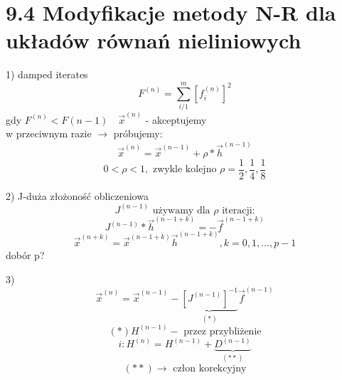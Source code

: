 \section{9.4 Modyfikacje metody N-R dla układów równań nieliniowych}

\begin{frame}{}
  \begin{block}{1) damped iterates}
    $$F^{(n)}=\sum_{i/1}^{m} [f_i^{(n)}]^2$$
    gdy $F^{(n)}<F{(n-1)}\quad\overrightarrow{x}^{(n)}$ - akceptujemy\\
    w przeciwnym razie $\rightarrow$ próbujemy:
    $$\overrightarrow{x}^{(n)}=\overrightarrow{x}^{(n-1)}+\rho*\overrightarrow{h}^{(n-1)}$$
    $$0<\rho<1,\text{ zwykle kolejno } \rho=\frac{1}{2},\frac{1}{4},\frac{1}{8}$$
  \end{block}
\end{frame}

\begin{frame}{}
  \begin{block}{2)}
    J-duża złożoność obliczeniowa
    $$J^{(n-1)}\text{ używamy dla }\rho\text{ iteracji:}$$
    $$J^{(n-1)}*\overrightarrow{h}^{(n-1+k)}=-\overrightarrow{f}^{(n-1+k)}$$
    $$\overrightarrow{x}^{(n+k)}=\overrightarrow{x}^{(n-1+k)}\overrightarrow{h}^{(n-1+k)}, k=0,1,...,p-1$$
    dobór p?
  \end{block}
\end{frame}

\begin{frame}{}
  \begin{block}{3)}
    $$\overrightarrow{x}^{(n)}=\overrightarrow{x}^{(n-1)}-\underbrace{[J^{(n-1)}]^{-1}}_{(*)}\overrightarrow{f}^{(n-1)}$$
    $$(*)H^{(n-1)}-\text{ przez przybliżenie}$$
    $${i:H^{(n)}=H^{(n-1)}+\underbrace{D^{(n-1)}}_{(**)}}$$
    $$(**)\rightarrow\text{ człon korekcyjny}$$
  \end{block}
\end{frame}